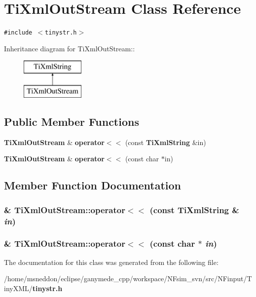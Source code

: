 \section{TiXmlOutStream Class Reference}
\label{classTiXmlOutStream}
{\tt \#include $<$tinystr.h$>$}

Inheritance diagram for TiXmlOutStream::\begin{figure}[H]
\begin{center}
\leavevmode
\includegraphics[height=2cm]{classTiXmlOutStream}
\end{center}
\end{figure}
\subsection*{Public Member Functions}
\begin{CompactItemize}
\item 
{\bf TiXmlOutStream} \& {\bf operator$<$$<$} (const {\bf TiXmlString} \&in)
\item 
{\bf TiXmlOutStream} \& {\bf operator$<$$<$} (const char $\ast$in)
\end{CompactItemize}


\subsection{Member Function Documentation}
\subsubsection{\& TiXmlOutStream::operator$<$$<$ (const {\bf TiXmlString} \& {\em in})\hspace{0.3cm}{\tt  [inline]}}\label{classTiXmlOutStream_3640dcb1c0903be3bc6966cdc9a79db6}


\subsubsection{\& TiXmlOutStream::operator$<$$<$ (const char $\ast$ {\em in})\hspace{0.3cm}{\tt  [inline]}}\label{classTiXmlOutStream_f2117e5a8cbfcb69544804ad2859bfb6}




The documentation for this class was generated from the following file:\begin{CompactItemize}
\item 
/home/msneddon/eclipse/ganymede\_\-cpp/workspace/NFsim\_\-svn/src/NFinput/TinyXML/{\bf tinystr.h}\end{CompactItemize}
